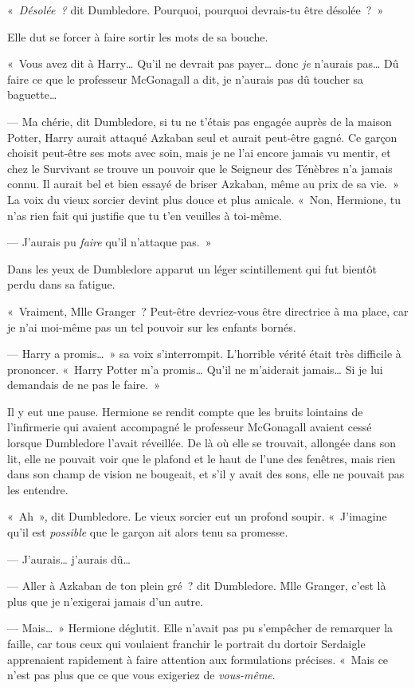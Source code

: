 «~\emph{Désolée~?} dit Dumbledore. Pourquoi, pourquoi devrais-tu être désolée~?~»

Elle dut se forcer à faire sortir les mots de sa bouche.

«~Vous avez dit à Harry… Qu'il ne devrait pas payer… donc \emph{je} n'aurais pas… Dû faire ce que le professeur McGonagall a dit, je n'aurais pas dû toucher sa baguette…

--- Ma chérie, dit Dumbledore, si tu ne t'étais pas engagée auprès de la maison Potter, Harry aurait attaqué Azkaban seul et aurait peut-être gagné. Ce garçon choisit peut-être ses mots avec soin, mais je ne l'ai encore jamais vu mentir, et chez le Survivant se trouve un pouvoir que le Seigneur des Ténèbres n'a jamais connu. Il aurait bel et bien essayé de briser Azkaban, même au prix de sa vie.~» La voix du vieux sorcier devint plus douce et plus amicale. «~Non, Hermione, tu n'as rien fait qui justifie que tu t'en veuilles à toi-même.

--- J'aurais pu \emph{faire} qu'il n'attaque pas.~»

Dans les yeux de Dumbledore apparut un léger scintillement qui fut bientôt perdu dans sa fatigue.

«~Vraiment, Mlle Granger~? Peut-être devriez-vous être directrice à ma place, car je n'ai moi-même pas un tel pouvoir sur les enfants bornés.

--- Harry a promis…~» sa voix s'interrompit. L'horrible vérité était très difficile à prononcer. «~Harry Potter m'a promis… Qu'il ne m'aiderait jamais… Si je lui demandais de ne pas le faire.~»

Il y eut une pause. Hermione se rendit compte que les bruits lointains de l'infirmerie qui avaient accompagné le professeur McGonagall avaient cessé lorsque Dumbledore l'avait réveillée. De là où elle se trouvait, allongée dans son lit, elle ne pouvait voir que le plafond et le haut de l'une des fenêtres, mais rien dans son champ de vision ne bougeait, et s'il y avait des sons, elle ne pouvait pas les entendre.

«~Ah~», dit Dumbledore. Le vieux sorcier eut un profond soupir. «~J'imagine qu'il est \emph{possible} que le garçon ait alors tenu sa promesse.

--- J'aurais… j'aurais dû…

--- Aller à Azkaban de ton plein gré~? dit Dumbledore. Mlle Granger, c'est là plus que je n'exigerai jamais d'un autre.

--- Mais…~» Hermione déglutit. Elle n'avait pas pu s'empêcher de remarquer la faille, car tous ceux qui voulaient franchir le portrait du dortoir Serdaigle apprenaient rapidement à faire attention aux formulations précises. «~Mais ce n'est pas plus que ce que vous exigeriez de \emph{vous-même}.


